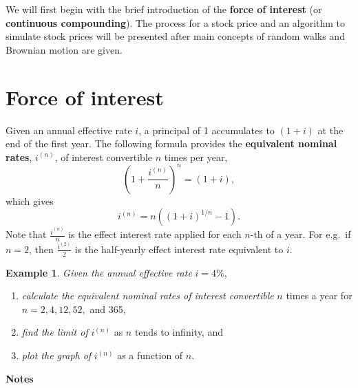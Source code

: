 \documentclass[
]{book}
\theoremstyle{definition}
\theoremstyle{definition}
\newtheorem{example}{Example}[chapter]
\theoremstyle{definition}
\theoremstyle{definition}
\theoremstyle{remark}
\begin{document}
We will first begin with the brief introduction of the \textbf{force of
interest} (or \textbf{continuous compounding}). The process for a stock
price and an algorithm to simulate stock prices will be presented after
main concepts of random walks and Brownian motion are given.

\hypertarget{force-of-interest}{%
\section{Force of interest}\label{force-of-interest}}

Given an annual effective rate \(i\), a principal of 1 accumulates to
\((1 + i)\) at the end of the first year. The following formula provides
the \textbf{equivalent nominal rates}, \(i^{(n)}\), of interest convertible \(n\)
times per year, \[\left(1 + \frac{i^{(n)}}{n} \right)^n  = (1 + i),\]
which gives \[i^{(n)} = n\left( (1+ i)^{1/n} - 1  \right).\] Note that
\(\displaystyle{\frac{i^{(n)}}{n}}\) is the effect interest rate applied
for each \(n\)-th of a year. For e.g.~if \(n =2\), then
\(\displaystyle{\frac{i^{(2)}}{2}}\) is the half-yearly effect interest
rate equivalent to \(i\).

\begin{example}

\emph{Given the annual effective rate} \(i = 4\%\),

\begin{enumerate}
\def\labelenumi{\arabic{enumi}.}
\item
  \emph{calculate the equivalent nominal rates of interest convertible} \(n\)
  times a year for \(n = 2,4,12, 52,\) and 365,
\item
  \emph{find the limit of} \(i^{(n)}\) as \(n\) tends to infinity, and
\item
  \emph{plot the graph of} \(i^{(n)}\) as a function of \(n\).
\end{enumerate}

\end{example}

\textbf{Notes}
\end{document}
